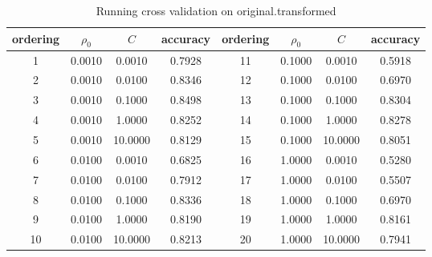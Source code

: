 \documentclass[12pt, fullpage,letterpaper]{article}
\begin{document}
\begin{enumerate}
 
\begin{table}[h] 
    \centering
    \begin{tabular}{|c|c|c|c|c|c|c|c|}
    \hline
  ordering  &$\rho_0$& $C$ & accuracy & ordering &  $\rho_0$& $C$ & accuracy \\
    \hline
   1  &  0.0010 &  0.0010 &  0.7928 &  11  &  0.1000 &  0.0010 &  0.5918\\
   2  &  0.0010 &  0.0100 &  0.8346 &  12  &  0.1000 &  0.0100 &  0.6970\\
   3  &  0.0010 &  0.1000 &  0.8498 &  13  &  0.1000 &  0.1000 &  0.8304\\
   4  &  0.0010 &  1.0000 &  0.8252 &  14  &  0.1000 &  1.0000 &  0.8278\\
   5  &  0.0010 &  10.0000 &  0.8129 &  15  &  0.1000 &  10.0000 &  0.8051\\
   6  &  0.0100 &  0.0010 &  0.6825 &  16  &  1.0000 &  0.0010 &  0.5280\\
   7  &  0.0100 &  0.0100 &  0.7912 &  17  &  1.0000 &  0.0100 &  0.5507\\
   8  &  0.0100 &  0.1000 &  0.8336 &  18  &  1.0000 &  0.1000 &  0.6970\\
   9  &  0.0100 &  1.0000 &  0.8190 &  19  &  1.0000 &  1.0000 &  0.8161\\
   10  &  0.0100 &  10.0000 &  0.8213 &  20  &  1.0000 &  10.0000 &  0.7941\\
      \hline
    \end{tabular}
    \caption{Running cross validation on original.transformed }\label{t:5}
  \end{table}



\end{enumerate}
\end{document}

